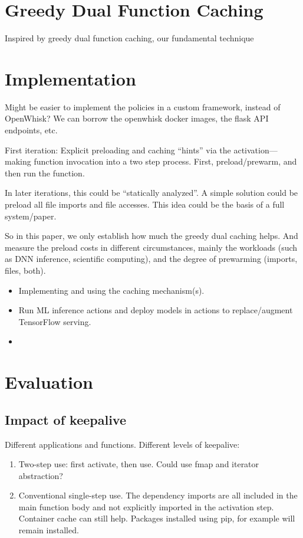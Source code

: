 \section{Greedy Dual Function Caching}

Inspired by greedy dual function caching, our fundamental technique

\section{Implementation}

Might be easier to implement the policies in a custom framework, instead of OpenWhisk?
We can borrow the openwhisk docker images, the flask API endpoints, etc.

First iteration: Explicit preloading and caching ``hints'' via the activation---making function invocation into a two step process. First, preload/prewarm, and then run the function.

In later iterations, this could be ``statically analyzed''. A simple solution could be preload all file imports and file accesses. This idea could be the basis of a full system/paper.

So in this paper, we only establish how much the greedy dual caching helps. And measure the preload costs in different circumstances, mainly the workloads (such as DNN inference, scientific computing), and the degree of prewarming (imports, files, both).



\begin{itemize}
\item Implementing and using the caching mechanism(s).
\item Run ML inference actions and deploy models in actions to replace/augment TensorFlow serving. 
\item 
\end{itemize}




\section{Evaluation}

\subsection{Impact of keepalive}

Different applications and functions.
Different levels of keepalive:
\begin{enumerate}
\item Two-step use: first activate, then use. Could use fmap and iterator abstraction? 
\item Conventional single-step use. The dependency imports are all included in the main function body and not explicitly imported in the activation step. Container cache can still help. Packages installed using pip, for example will remain installed. 
\end{enumerate}

